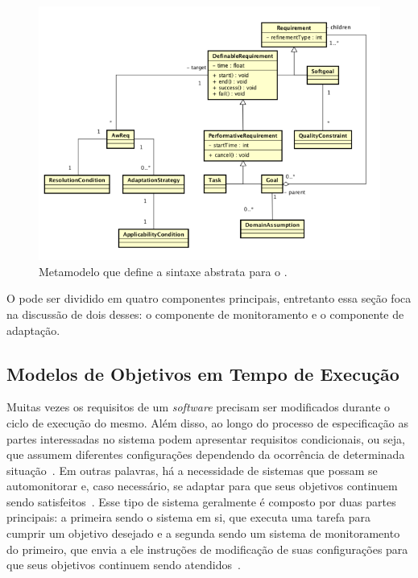 \begin{figure}
	\centering
	\includegraphics[width=1\textwidth]{figuras/metamodelos/metamodelo-zanshin-antigo.png}
	\caption{Metamodelo que define a sintaxe abstrata para o \zanshin. }
	\label{figura-metamodelo-antigo}
\end{figure}

O \zanshin pode ser dividido em quatro componentes principais, entretanto essa seção foca na discussão de dois desses: o componente de monitoramento e o componente de adaptação.


\subsection{Modelos de Objetivos em Tempo de Execução}
\label{sec-referencial-engenharia-objetivos-runtime}

Muitas vezes os requisitos de um \textit{software} precisam ser modificados durante o ciclo de execução do mesmo. Além disso, ao longo do processo de especificação as partes interessadas no sistema podem apresentar requisitos condicionais, ou seja, que assumem diferentes configurações dependendo da ocorrência de determinada situação~\cite{souza2012requirement}. Em outras palavras, há a necessidade de sistemas que possam se automonitorar e, caso necessário, se adaptar para que seus objetivos continuem sendo satisfeitos~\cite{dalpiaz2013runtime}. Esse tipo de sistema geralmente é composto por duas partes principais: a primeira sendo o sistema em si, que executa uma tarefa para cumprir um objetivo desejado e a segunda sendo um sistema de monitoramento do primeiro, que envia a ele instruções de modificação de suas configurações para que seus objetivos continuem sendo atendidos~\cite{souza2013awareness}. 


